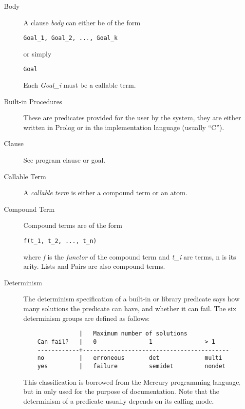 \begin{description}
\item[Body]
A clause {\it body} can either be of the form
\begin{verbatim}
Goal_1, Goal_2, ..., Goal_k
\end{verbatim}
or simply
\begin{verbatim}
Goal
\end{verbatim}
Each {\it Goal_i} must be  a callable term.

\item[Built-in Procedures]
These are predicates provided for the user by the
{\eclipse} system, they are either written in Prolog or in the implementation
language (usually ``C'').


\item[Clause]
See program clause or goal.

\item[Callable Term]
A {\it callable term} is either a compound term or an atom.

\item[Compound Term]
Compound terms are of the form
\begin{verbatim}
f(t_1, t_2, ..., t_n)
\end{verbatim}
where {\it f} is the {\it functor} of the compound term
and {\it t_i} are terms, n is its arity. Lists and Pairs are also 
compound terms.

\item[Determinism]
The determinism specification of a built-in or library predicate says
how many solutions the predicate can have, and whether it can fail.
The six determinism groups are defined as follows:
\begin{verbatim}
                |   Maximum number of solutions
    Can fail?   |   0               1               > 1
    ------------+------------------------------------------
    no          |   erroneous       det             multi
    yes         |   failure         semidet         nondet
\end{verbatim}
This classification is borrowed from the Mercury programming language,
but in {\eclipse} only used for the purpose of documentation.
Note that the determinism of a predicate usually depends on its calling mode.


\end{description}
